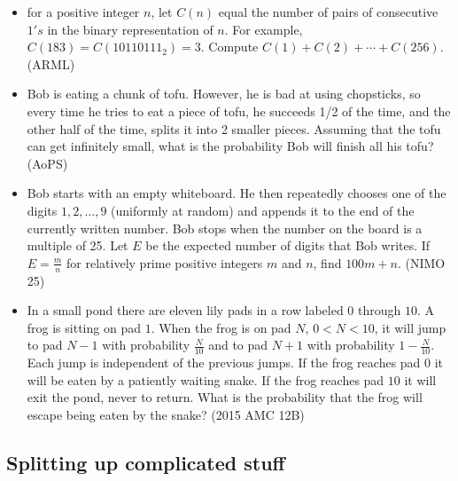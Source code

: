 \documentclass{article}
\begin{document}
\begin{itemize}
\item for a positive integer $n$, let $C(n)$ equal the number of pairs of consecutive $1's$ in the binary representation of $n$. For example, $C(183)=C(10110111_2)=3$. Compute $C(1)+C(2)+\cdots+C(256)$. (ARML)

\item Bob is eating a chunk of tofu. However, he is bad at using chopsticks, so every time he tries to eat a piece of tofu, he succeeds 1/2 of the time, and the other half of the time, splits it into 2 smaller pieces. Assuming that the tofu can get infinitely small, what is the probability Bob will finish all his tofu? (AoPS)

\item Bob starts with an empty whiteboard. He then repeatedly chooses one of the digits $1,2,\ldots,9$ (uniformly at random) and appends it to the end of the currently written number. Bob stops when the number on the board is a multiple of 25. Let $E$ be the expected number of digits that Bob writes. If $E=\frac{m}{n}$ for relatively prime positive integers $m$ and $n$, find $100m+n$. (NIMO 25)

\item In a small pond there are eleven lily pads in a row labeled $0$ through $10$. A frog is sitting on pad $1$. When the frog is on pad $N$, $0<N<10$, it will jump to pad $N-1$ with probability $\frac{N}{10}$ and to pad $N+1$ with probability $1-\frac{N}{10}$. Each jump is independent of the previous jumps. If the frog reaches pad $0$ it will be eaten by a patiently waiting snake. If the frog reaches pad $10$ it will exit the pond, never to return. What is the probability that the frog will escape being eaten by the snake? (2015 AMC 12B)

\end{itemize}


\subsection{Splitting up complicated stuff}
\end{document}
